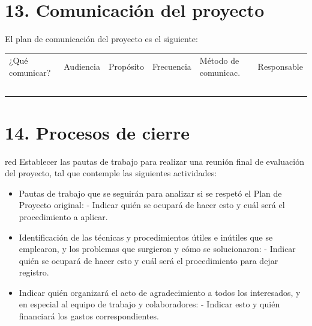 \documentclass[
11pt, %
codirector, %
]{charter}
\begin{document}
\section{13. Comunicación del proyecto}
\label{sec:comunicaciones}

El plan de comunicación del proyecto es el siguiente:

\begin{table}[htpb]
\centering
\begin{tabularx}{\linewidth}{@{}|X|C{2.4cm}|C{3cm}|C{1.8cm}|C{2cm}|C{2.1cm}|@{}}
\hline
{} 
           \\ \hline
{} 
¿Qué comunicar? & Audiencia & Propósito & Frecuencia & Método de comunicac. & Responsable \\ \hline
                &           &           &            &                      &             \\ \hline
                &           &           &            &                      &             \\ \hline
                &           &           &            &                      &             \\ \hline
                &           &           &            &                      &             \\ \hline
                &           &           &            &                      &             \\ \hline
\end{tabularx}
\end{table}



\section{14. Procesos de cierre}    
\label{sec:cierre}

\begin{consigna}{red}
Establecer las pautas de trabajo para realizar una reunión final de evaluación del proyecto, tal que contemple las siguientes actividades:

\begin{itemize}
	\item Pautas de trabajo que se seguirán para analizar si se respetó el Plan de Proyecto original:
	 - Indicar quién se ocupará de hacer esto y cuál será el procedimiento a aplicar. 
	\item Identificación de las técnicas y procedimientos útiles e inútiles que se emplearon, y los problemas que surgieron y cómo se solucionaron:
	 - Indicar quién se ocupará de hacer esto y cuál será el procedimiento para dejar registro.
	\item Indicar quién organizará el acto de agradecimiento a todos los interesados, y en especial al equipo de trabajo y colaboradores:
	  - Indicar esto y quién financiará los gastos correspondientes.
\end{itemize}

\end{consigna}
\end{document}
